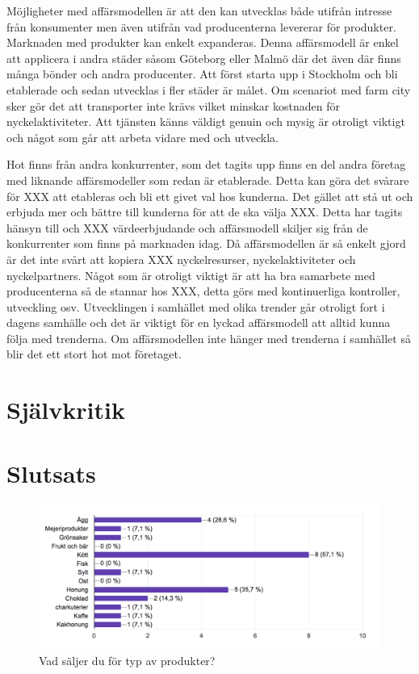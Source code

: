 \documentclass[10pt,a4paper,oneside]{article}
\begin{document}
Möjligheter med affärsmodellen är att den kan utvecklas både utifrån intresse från konsumenter men även utifrån vad producenterna levererar för produkter. Marknaden med produkter kan enkelt expanderas. Denna affärsmodell är enkel att applicera i andra städer såsom Göteborg eller Malmö där det även där finns många bönder och andra producenter. Att först starta upp i Stockholm och bli etablerade och sedan utvecklas i fler städer är målet. Om scenariot med farm city sker gör det att transporter inte krävs vilket minskar kostnaden för nyckelaktiviteter. Att tjänsten känns väldigt genuin och mysig är otroligt viktigt och något som går att arbeta vidare med och utveckla.  

Hot finns från andra konkurrenter, som det tagits upp finns en del andra företag med liknande affärsmodeller som redan är etablerade. Detta kan göra det svårare för XXX att etableras och bli ett givet val hos kunderna. Det gället att stå ut och erbjuda mer och bättre till kunderna för att de ska välja XXX. Detta har tagits hänsyn till och XXX värdeerbjudande och affärsmodell skiljer sig från de konkurrenter som finns på marknaden idag. Då affärsmodellen är så enkelt gjord är det inte svårt att kopiera XXX nyckelresurser, nyckelaktiviteter och nyckelpartners. Något som är otroligt viktigt är att ha bra samarbete med producenterna så de stannar hos XXX, detta görs med kontinuerliga kontroller, utveckling osv. Utvecklingen i samhället med olika trender går otroligt fort i dagens samhälle och det är viktigt för en lyckad affärsmodell att alltid kunna följa med trenderna. Om affärsmodellen inte hänger med trenderna i samhället så blir det ett stort hot mot företaget. 

\newpage

\section{Självkritik}
\newpage

\section{Slutsats}
\newpage



\newpage


\begin{figure}
	\includegraphics[scale=0.6]{1.png}
	\caption{Vad s\"aljer du f\"or typ av produkter?}
	\label{Marknadsundersökning}
\end{figure}
\end{document}
